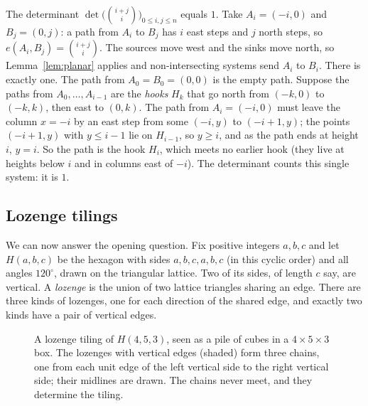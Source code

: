 \begin{example}\label{ex:binomialdet}
The determinant $\det\bigl(\binom{i+j}{i}\bigr)_{0\le i,j\le n}$ equals $1$. Take $A_i=(-i,0)$ and $B_j=(0,j)$: a path from
$A_i$ to $B_j$ has $i$ east steps and $j$ north steps, so $e(A_i,B_j)=\binom{i+j}i$. The sources move west and the sinks
move north, so Lemma~\ref{lem:planar} applies and non-intersecting systems send $A_i$ to $B_i$. There is exactly one.
The path from $A_0=B_0=(0,0)$ is the empty path. Suppose the paths from $A_0,\dots,A_{i-1}$ are the \emph{hooks} $H_k$
that go north from $(-k,0)$ to $(-k,k)$, then east to $(0,k)$. The path from $A_i=(-i,0)$ must leave the column $x=-i$ by
an east step from some $(-i,y)$ to $(-i+1,y)$; the points $(-i+1,y)$ with $y\le i-1$ lie on $H_{i-1}$, so $y\ge i$, and as the
path ends at height $i$, $y=i$. So the path is the hook $H_i$, which meets no earlier hook (they live at heights below
$i$ and in columns east of $-i$). The determinant counts this single system: it is $1$.
\end{example}

\subsection*{Lozenge tilings}

We can now answer the opening question. Fix positive integers $a,b,c$ and let $H(a,b,c)$ be the hexagon with sides
$a,b,c,a,b,c$ (in this cyclic order) and all angles $120^\circ$, drawn on the triangular lattice. Two of its sides, of
length $c$ say, are vertical. A \emph{lozenge} is the union of two lattice triangles sharing an edge. There are three
kinds of lozenges, one for each direction of the shared edge, and exactly two kinds have a pair of vertical edges.

\begin{figure}[ht]
\centering
{}
\caption{A lozenge tiling of $H(4,5,3)$, seen as a pile of cubes in a $4\times5\times3$ box. The lozenges with vertical
edges (shaded) form three chains, one from each unit edge of the left vertical side to the right vertical side; their
midlines are drawn. The chains never meet, and they determine the tiling.}
\label{fig:lozenge}
\end{figure}

